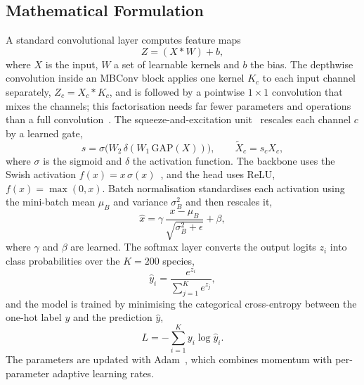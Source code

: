 \documentclass[conference]{IEEEtran}
\begin{document}
\subsection{Mathematical Formulation}
A standard convolutional layer computes feature maps
\begin{equation}
Z = (X * W) + b,
\end{equation}
where $X$ is the input, $W$ a set of learnable kernels and $b$ the bias. The
depthwise convolution inside an MBConv block applies one kernel $K_c$ to each
input channel separately, $Z_c = X_c * K_c$, and is followed by a pointwise
$1\times1$ convolution that mixes the channels; this factorisation needs far
fewer parameters and operations than a full convolution~\cite{sandler2018}. The
squeeze-and-excitation unit~\cite{hu2018} rescales each channel $c$ by a learned
gate,
\begin{equation}
s = \sigma\big(W_2\,\delta(W_1\,\mathrm{GAP}(X))\big),\qquad \tilde{X}_c = s_c X_c,
\end{equation}
where $\sigma$ is the sigmoid and $\delta$ the activation function. The backbone
uses the Swish activation $f(x) = x\,\sigma(x)$~\cite{ramachandran2017}, and the
head uses ReLU, $f(x)=\max(0,x)$. Batch normalisation standardises each
activation using the mini-batch mean $\mu_B$ and variance $\sigma_B^2$ and then
rescales it,
\begin{equation}
\hat{x} = \gamma\,\frac{x-\mu_B}{\sqrt{\sigma_B^2+\epsilon}} + \beta,
\end{equation}
where $\gamma$ and $\beta$ are learned. The softmax layer converts the output
logits $z_i$ into class probabilities over the $K=200$ species,
\begin{equation}
\hat{y}_i = \frac{e^{z_i}}{\sum_{j=1}^{K} e^{z_j}},
\end{equation}
and the model is trained by minimising the categorical cross-entropy between
the one-hot label $y$ and the prediction $\hat{y}$,
\begin{equation}
L = -\sum_{i=1}^{K} y_i \log \hat{y}_i .
\end{equation}
The parameters are updated with Adam~\cite{kingma2015}, which combines momentum
with per-parameter adaptive learning rates.
\end{document}
